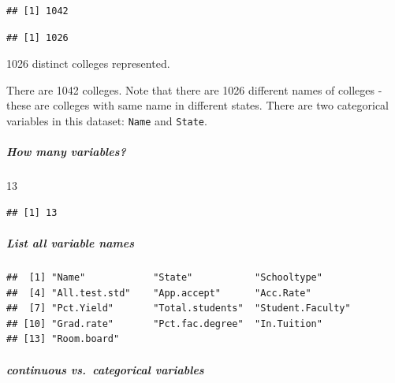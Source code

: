 \documentclass[]{article}
\newenvironment{Shaded}{\begin{snugshade}}{\end{snugshade}}
\newcommand{\KeywordTok}[1]{\textcolor[rgb]{0.13,0.29,0.53}{\textbf{#1}}}
\newcommand{\DecValTok}[1]{\textcolor[rgb]{0.00,0.00,0.81}{#1}}
\newcommand{\CommentTok}[1]{\textcolor[rgb]{0.56,0.35,0.01}{\textit{#1}}}
\newcommand{\OperatorTok}[1]{\textcolor[rgb]{0.81,0.36,0.00}{\textbf{#1}}}
\newcommand{\NormalTok}[1]{#1}
\let\oldsubparagraph\subparagraph
\renewcommand{\subparagraph}[1]{\oldsubparagraph{#1}\mbox{}}
\begin{document}
\begin{Shaded}
\end{Shaded}

\begin{verbatim}
## [1] 1042
\end{verbatim}

\begin{Shaded}
\end{Shaded}

\begin{verbatim}
## [1] 1026
\end{verbatim}

1026 distinct colleges represented.

There are 1042 colleges. Note that there are 1026 different names of
colleges - these are colleges with same name in different states. There
are two categorical variables in this dataset: \texttt{Name} and
\texttt{State}.

\subparagraph{How many variables?}\label{how-many-variables}

\begin{Shaded}
\begin{Highlighting}[]
\DecValTok{13}
\end{Highlighting}
\end{Shaded}

\begin{verbatim}
## [1] 13
\end{verbatim}

\subparagraph{List all variable names}\label{list-all-variable-names}

\begin{verbatim}
##  [1] "Name"            "State"           "Schooltype"     
##  [4] "All.test.std"    "App.accept"      "Acc.Rate"       
##  [7] "Pct.Yield"       "Total.students"  "Student.Faculty"
## [10] "Grad.rate"       "Pct.fac.degree"  "In.Tuition"     
## [13] "Room.board"
\end{verbatim}

\subparagraph{continuous vs.~categorical
variables}\label{continuous-vs.categorical-variables}
\end{document}
